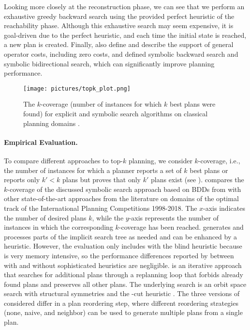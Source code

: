 Looking more closely at the reconstruction phase, we can see that we perform an exhaustive greedy backward search using the provided perfect heuristic of the reachability phase.
Although this exhaustive search may seem expensive, it is goal-driven due to the perfect heuristic, and each time the initial state is reached, a new plan is created.
Finally, \textcite{speck-et-al-aaai2020} also define and describe the support of general operator costs, including zero costs, and defined symbolic backward search and symbolic bidirectional search, which can significantly improve planning performance.

\begin{figure}
    \begin{center}
        \texttt{[image: pictures/topk\_plot.png]}
    \end{center}
    \caption[The $k$-coverage for top-$k$ planning.]{The $k$-coverage (number of instances for which $k$ best plans were found) for explicit and symbolic search algorithms on classical planning domains \autocite{speck-et-al-aaai2020}.}
    \label{fig:coverage_time_topk}
\end{figure}


\paragraph{Empirical Evaluation.}
To compare different approaches to top-$k$ planning, we consider $k$-coverage, i.e., the number of instances for which a planner reports a set of $k$ best plans or reports only $k' < k$ plans but proves that only $k'$ plans exist (see ).
 compares the $k$-coverage of the discussed symbolic search approach based on BDDs from \textcite{speck-et-al-aaai2020} with other state-of-the-art approaches from the literature on domains of the optimal track of the International Planning Competitions 1998-2018.
The $x$-axis indicates the number of desired plans $k$, while the $y$-axis represents the number of instances in which the corresponding $k$-coverage has been reached.
\kstar{} \autocite{aljazzar-leue-aij2011,katz-et-al-icaps2018} generates and processes parts of the implicit search tree as needed and can be enhanced by a heuristic.
However, the evaluation only includes \kstar{} with the blind heuristic because \kstar{} is very memory intensive, so the performance differences reported by \textcite{speck-et-al-aaai2020} between \kstar{} with and without sophisticated heuristics are negligible.
\forbidk{} \autocite{katz-et-al-icaps2018} is an iterative approach that searches for additional plans through a replanning loop that forbids already found plans and preserves all other plans.
The underlying search is an orbit space search with structural symmetries \autocite{alkhazraji-et-al-ipc2014,domshlak-et-al-tr2015} and the -cut heuristic \autocite{helmert-domshlak-icaps2009}.
The three versions of \forbidk{} considered differ in a plan reordering step, where different reordering strategies (none, naive, and neighbor) can be used to generate multiple plans from a single plan.

